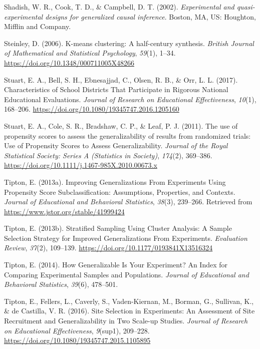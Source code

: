 \documentclass[english,man,floatsintext]{apa6}
\begin{document}
\leavevmode\hypertarget{ref-shadishExperimentalQuasiexperimentalDesigns2002}{}%
Shadish, W. R., Cook, T. D., \& Campbell, D. T. (2002). \emph{Experimental and quasi-experimental designs for generalized causal inference}. Boston, MA, US: Houghton, Mifflin and Company.

\leavevmode\hypertarget{ref-steinleyKmeansClusteringHalfcentury2006}{}%
Steinley, D. (2006). K-means clustering: A half-century synthesis. \emph{British Journal of Mathematical and Statistical Psychology}, \emph{59}(1), 1--34. \url{https://doi.org/10.1348/000711005X48266}

\leavevmode\hypertarget{ref-stuartCharacteristicsSchoolDistricts2017}{}%
Stuart, E. A., Bell, S. H., Ebnesajjad, C., Olsen, R. B., \& Orr, L. L. (2017). Characteristics of School Districts That Participate in Rigorous National Educational Evaluations. \emph{Journal of Research on Educational Effectiveness}, \emph{10}(1), 168--206. \url{https://doi.org/10.1080/19345747.2016.1205160}

\leavevmode\hypertarget{ref-stuartUsePropensityScores2011}{}%
Stuart, E. A., Cole, S. R., Bradshaw, C. P., \& Leaf, P. J. (2011). The use of propensity scores to assess the generalizability of results from randomized trials: Use of Propensity Scores to Assess Generalizability. \emph{Journal of the Royal Statistical Society: Series A (Statistics in Society)}, \emph{174}(2), 369--386. \url{https://doi.org/10.1111/j.1467-985X.2010.00673.x}

\leavevmode\hypertarget{ref-tiptonImprovingGeneralizationsExperiments2013}{}%
Tipton, E. (2013a). Improving Generalizations From Experiments Using Propensity Score Subclassification: Assumptions, Properties, and Contexts. \emph{Journal of Educational and Behavioral Statistics}, \emph{38}(3), 239--266. Retrieved from \url{https://www.jstor.org/stable/41999424}

\leavevmode\hypertarget{ref-tiptonStratifiedSamplingUsing2013}{}%
Tipton, E. (2013b). Stratified Sampling Using Cluster Analysis: A Sample Selection Strategy for Improved Generalizations From Experiments. \emph{Evaluation Review}, \emph{37}(2), 109--139. \url{https://doi.org/10.1177/0193841X13516324}

\leavevmode\hypertarget{ref-tiptonHowGeneralizableYour2014}{}%
Tipton, E. (2014). How Generalizable Is Your Experiment? An Index for Comparing Experimental Samples and Populations. \emph{Journal of Educational and Behavioral Statistics}, \emph{39}(6), 478--501.

\leavevmode\hypertarget{ref-tiptonSiteSelectionExperiments2016}{}%
Tipton, E., Fellers, L., Caverly, S., Vaden-Kiernan, M., Borman, G., Sullivan, K., \& de Castilla, V. R. (2016). Site Selection in Experiments: An Assessment of Site Recruitment and Generalizability in Two Scale-up Studies. \emph{Journal of Research on Educational Effectiveness}, \emph{9}(sup1), 209--228. \url{https://doi.org/10.1080/19345747.2015.1105895}
\end{document}
